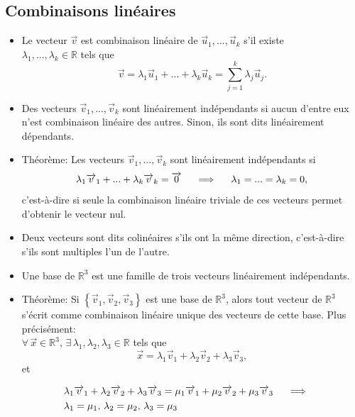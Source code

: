 \documentclass[12pt,a4paper]{article}
\newcommand{\vect}{\overrightarrow}
\begin{document}
\newpage
\subsection{Combinaisons linéaires}
\begin{itemize}[label=$\bullet$]
\item Le vecteur $\vect{v}$ est \colorbox{def!40}{combinaison linéaire} de $\vect{u}_1,...,\vect{u}_k$ s'il existe \\ $\lambda_1,...,\lambda_k\in\mathbb{R}$ tels que $$\displaystyle\vect{v}=\lambda_1\vect{u}_1+...+\lambda_k\vect{u}_k=\sum_{j=1}^k\lambda_j \vect{u}_j.$$

\item Des vecteurs $\vect{v}_1,...,\vect{v}_k$ sont \colorbox{def!40}{linéairement indépendants} si aucun d'entre eux n'est combinaison linéaire des autres. Sinon, ils sont dits \colorbox{def!40}{linéairement dépendants}.
\item \textcolor{th!60!black}{Théorème:} Les vecteurs $\vect{v}_1,...,\vect{v}_k$ sont linéairement indépendants si
$$\lambda_1\vect{v}_1+...+\lambda_k\vect{v}_k=\vect{0}\hspace{0.5cm}\Longrightarrow \hspace{0.5cm}\lambda_1=...=\lambda_k=0,$$
c'est-à-dire si seule la combinaison linéaire triviale de ces vecteurs permet d'obtenir le vecteur nul.
\item Deux vecteurs sont dits \colorbox{def!40}{colinéaires} s'ils ont la même direction, c'est-à-dire s'ils sont multiples l'un de l'autre.
\item Une \colorbox{def!40}{base} de $\mathbb{R}^3$ est une famille de trois vecteurs linéairement indépendants.

\item \textcolor{th!60!black}{Théorème:} Si $\left\{\vect{v}_1,\vect{v}_2,\vect{v}_3\right\}$ est une base de $\mathbb{R}^3$, alors tout vecteur de $\mathbb{R}^3$ s'écrit comme combinaison linéaire unique des vecteurs de cette base. Plus précisément:
\\

 $\forall\,\vect{x}\in\mathbb{R}^3, \,\exists\,\lambda_1,\lambda_2,\lambda_3\in\mathbb{R}$ tels que $$\vect{x}=\lambda_1\vect{v}_1+\lambda_2\vect{v}_2+\lambda_3\vect{v}_3,$$ et

\begin{align*}
&\lambda_1\vect{v}_1+\lambda_2\vect{v}_2+\lambda_3\vect{v}_3=\mu_1\vect{v}_1+\mu_2\vect{v}_2+\mu_3\vect{v}_3\hspace{0.5cm}\Longrightarrow\hspace{0.5cm}\\ &\lambda_1=\mu_1,\,\lambda_2=\mu_2,\,\lambda_3=\mu_3
\end{align*}
\end{itemize}
\end{document}
